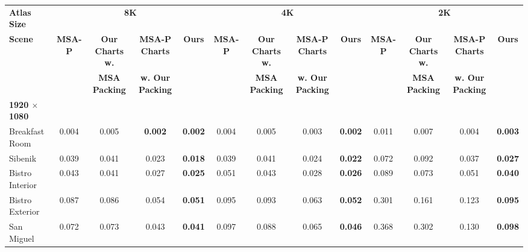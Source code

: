 \begin{table*}[t]
\scriptsize
\setlength{\tabcolsep}{3pt}
\centering
\begin{tabular}{l cccc|cccc|cccc}
\textbf{Atlas Size}           & \multicolumn{4}{c|}{\textbf{8K}} & \multicolumn{4}{c|}{\textbf{4K}}  & \multicolumn{4}{c}{\textbf{2K}}  \\
\textbf{Scene}                & \textbf{MSA-P} & \textbf{Our Charts w.} & \textbf{MSA-P Charts}   & \textbf{Ours}           & \textbf{MSA-P} & \textbf{Our Charts w.} & \textbf{MSA-P Charts}   & \textbf{Ours}           & \textbf{MSA-P} & \textbf{Our Charts w.} & \textbf{MSA-P Charts}   & \textbf{Ours}           \\
                              &                & \textbf{MSA Packing}   & \textbf{w. Our Packing} & \textbf{}               &                & \textbf{MSA Packing}   & \textbf{w. Our Packing} &                         &                & \textbf{MSA Packing}   & \textbf{w. Our Packing} &                         \\
\hline
\textbf{1920 $\times$ 1080}   & & & & & & & & & & & & \\
Breakfast Room                & 0.004          & 0.005                  & \textbf{0.002}          & \textbf{0.002}          & 0.004          & 0.005                  & 0.003                   & \textbf{0.002}          & 0.011          & 0.007                  & 0.004                   & \textbf{0.003}          \\
Sibenik                       & 0.039          & 0.041                  & 0.023                   & \textbf{0.018}          & 0.039          & 0.041                  & 0.024                   & \textbf{0.022}          & 0.072          & 0.092                  & 0.037                   & \textbf{0.027}          \\
Bistro Interior               & 0.043          & 0.041                  & 0.027                   & \textbf{0.025}          & 0.051          & 0.043                  & 0.028                   & \textbf{0.026}          & 0.089          & 0.073                  & 0.051                   & \textbf{0.040}          \\
Bistro Exterior               & 0.087          & 0.086                  & 0.054                   & \textbf{0.051}          & 0.095          & 0.093                  & 0.063                   & \textbf{0.052}          & 0.301          & 0.161                  & 0.123                   & \textbf{0.095}          \\
San Miguel                    & 0.072          & 0.073                  & 0.043                   & \textbf{0.041}          & 0.097          & 0.088                  & 0.065                   & \textbf{0.046}          & 0.368          & 0.302                  & 0.130                   & \textbf{0.098}          \\

\end{tabular}
\end{table*}
